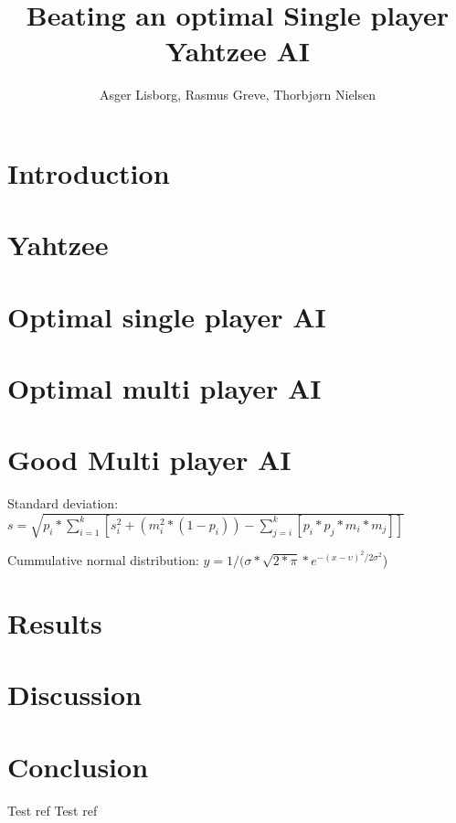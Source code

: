 \documentclass[11pt]{article}
\title{Beating an optimal Single player Yahtzee AI}
\author{Asger Lisborg, Rasmus Greve, Thorbjørn Nielsen}
\begin{document}
\maketitle

\begin{abstract}

\end{abstract}

\pagebreak

\section{Introduction}


\section{Yahtzee}


\section{Optimal single player AI}


\section{Optimal multi player AI}


\section{Good Multi player AI}


Standard deviation: $s = \sqrt{p_i * \sum_{i=1}^{k} \left[s_i^2 + (m_i^2 * (1 - p_i)) - \sum_{j=i}^{k} \left[p_i * p_j * m_i * m_j\right]\right]}$

Cummulative normal distribution: $y = 1 /(\sigma * \sqrt{2 * \pi} * e^{-(x - \upsilon)^2 / 2 \sigma^2}$)

\section{Results}


\section{Discussion}


\section{Conclusion}
Test ref \cite{pawlewicz2011nearly}
Test ref \cite{yahtzeerules}




\end{document}
